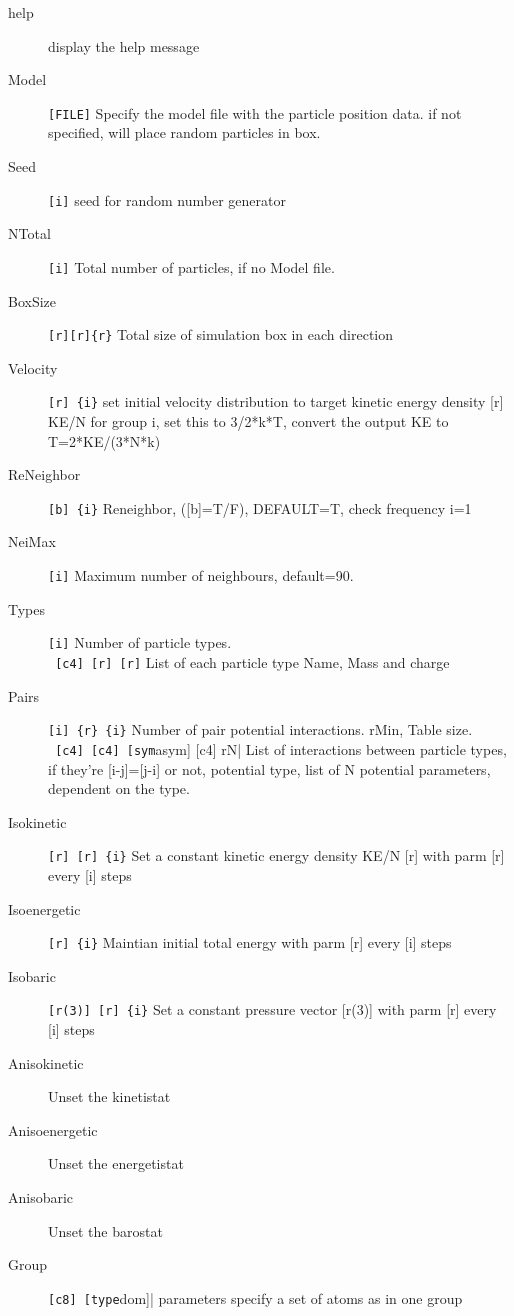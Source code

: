 \documentclass[a4paper,11pt]{scrbook}              %
\begin{document}
\begin{description}
\item [help] display the help message
\item [Model] \verb|[FILE]|       Specify the model file with the particle position data. 
                    if not specified, will place random particles in box.
\item [Seed] \verb|[i]|           seed for random number generator
\item [NTotal] \verb|[i]|         Total number of particles, if no Model file.
\item [BoxSize] \verb|[r][r]{r}|  Total size of simulation box in each direction
\item [Velocity] \verb|[r] {i}|   set initial velocity distribution to target kinetic energy
                    density [r] KE/N for group {i}, set this to 3/2*k*T,
                    convert the output KE to T=2*KE/(3*N*k)
\item [ReNeighbor] \verb|[b] {i}|  Reneighbor, ([b]=T/F), DEFAULT=T, check frequency {i}=1
\item [NeiMax] \verb|[i]|         Maximum number of neighbours, default=90.
\item [Types] \verb|[i]|          Number of particle types. \\
\verb| [c4] [r] [r]|      List of each particle type Name, Mass and charge
\item [Pairs] \verb|[i] {r} {i}|  Number of pair potential interactions. rMin, Table size. \\
\verb| [c4] [c4] [sym|asym] [c4] {rN}|   List of interactions between particle
                    types, if they're [i-j]=[j-i] or not, potential type,
                    list of N potential parameters, dependent on the type.
\item [Isokinetic] \verb|[r] [r] {i}| Set a constant kinetic energy density KE/N [r] with
                     parm [r] every [i] steps
\item [Isoenergetic] \verb|[r] {i}| Maintian initial total energy with parm [r] every [i] steps
\item [Isobaric] \verb|[r(3)] [r] {i}| Set a constant pressure vector [r(3)] with parm [r] every [i] steps
\item [Anisokinetic]       Unset the kinetistat
\item [Anisoenergetic]     Unset the energetistat
\item [Anisobaric]         Unset the barostat
\item [Group] \verb|[c8] [type|dom]| parameters   specify a set of atoms as in one group

\end{description}
\end{document}
